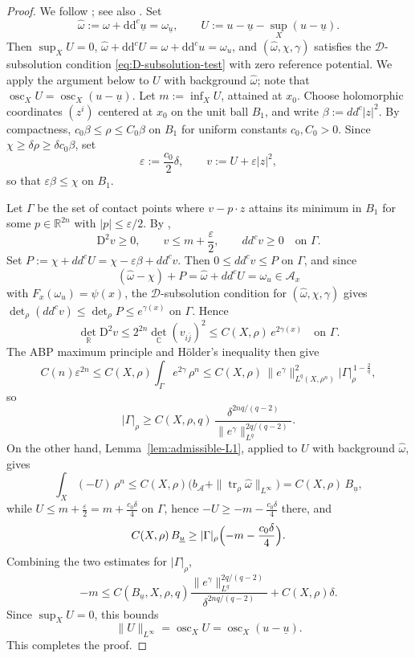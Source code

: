 \documentclass[oneside,english,letterpaper]{amsart}
\numberwithin{equation}{section}
\theoremstyle{plain}
\theoremstyle{definition}
\theoremstyle{remark}
\renewcommand{\d}{\mathrm{d}}
\newcommand{\ddc}{\d\d^c}
\def\D{\mathrm D}
\begin{document}
\begin{proof}
	We follow \cite[Proposition~11]{MR3807322}; see also
	\autocite{MR2156505}. Set
	\[
		\widehat\omega:=\omega+\ddc\underline u=\omega_{\underline u},
		\qquad
		U:=u-\underline u-\sup_X(u-\underline u).
	\]
	Then $\sup_XU=0$, $\widehat\omega+\ddc U=\omega+\ddc u=\omega_u$,
	and $(\widehat\omega,\chi,\gamma)$ satisfies the
	$\mathcal D$-subsolution condition \eqref{eq:D-subsolution-test}
	with zero reference potential. We apply the argument below to $U$
	with background $\widehat\omega$; note that
	$\operatorname{osc}_XU=\operatorname{osc}_X(u-\underline u)$.
	Let $m:=\inf_XU$, attained at $x_0$. Choose holomorphic
	coordinates $(z^i)$ centered at $x_0$ on the unit ball $B_1$, and
	write $\beta:=dd^c|z|^2$. By compactness,
	$c_0\beta\le\rho\le C_0\beta$ on $B_1$ for uniform constants
	$c_0,C_0>0$. Since $\chi\ge\delta\rho\ge\delta c_0\beta$, set
	\[
		\varepsilon:=\frac{c_0}{2}\delta,
		\qquad v:=U+\varepsilon|z|^2,
	\]
	so that $\varepsilon\beta\le\chi$ on $B_1$.

	Let $\Gamma$ be the set of contact points where $v-p\cdot z$
	attains its minimum in $B_1$ for some $p\in\mathbb R^{2n}$ with
	$|p|\le\varepsilon/2$. By \cite[Proposition~10]{MR3807322},
	\[
		\D^2v\ge0,\qquad v\le m+\frac{\varepsilon}{2},\qquad
		dd^cv\ge0\quad\text{on }\Gamma.
	\]
	Set $P:=\chi+dd^cU=\chi-\varepsilon\beta+dd^cv$. Then
	$0\le dd^cv\le P$ on $\Gamma$, and since
	\[(\widehat\omega-\chi)+P
	=\widehat\omega+dd^cU=\omega_u\in\mathcal A_x\] with
	$F_x(\omega_u)=\psi(x)$, the $\mathcal D$-subsolution condition
	for $(\widehat\omega,\chi,\gamma)$ gives
	$\det_\rho(dd^cv)\le\det_\rho P\le e^{\gamma(x)}$ on
	$\Gamma$. Hence
	\[
		\det_{\mathbb R}\D^2v
		\le 2^{2n}\det_{\mathbb C}(v_{i\bar j})^2
		\le C(X,\rho)\,e^{2\gamma(x)}
		\quad\text{on }\Gamma.
	\]
	The ABP maximum principle and H\"older's inequality then give
	\[
		C(n)\varepsilon^{2n}
		\le C(X,\rho)\int_\Gamma e^{2\gamma}\,\rho^n
		\le C(X,\rho)\,\|e^\gamma\|_{L^q(X,\rho^n)}^2
			|\Gamma|_\rho^{\,1-\frac{2}{q}},
	\]
	so
	\[
		|\Gamma|_\rho
		\ge
		C(X,\rho,q)\,
		\frac{\delta^{2nq/(q-2)}}
		{\|e^\gamma\|_{L^q}^{2q/(q-2)}}.
	\]
	On the other hand, Lemma~\ref{lem:admissible-L1}, applied to
	$U$ with background $\widehat\omega$, gives
	\[
		\int_X(-U)\,\rho^n
		\le C(X,\rho)\bigl(b_{\mathcal A}
			+\|\operatorname{tr}_\rho\widehat\omega\|_{L^\infty}\bigr)
		= C(X,\rho)\,B_{\underline u},
	\]
	while $U\le m+\frac{\varepsilon}{2}=m+\frac{c_0\delta}{4}$ on
	$\Gamma$, hence $-U\ge-m-\frac{c_0\delta}{4}$ there, and
	\[
		C(X,\rho)\,B_{\underline u}
		\ge |\Gamma|_\rho\Bigl(-m-\frac{c_0\delta}{4}\Bigr).
	\]
	Combining the two estimates for $|\Gamma|_\rho$,
	\[
		-m
		\le
		C(B_{\underline u},X,\rho,q)
		\frac{\|e^\gamma\|_{L^q}^{2q/(q-2)}}
		{\delta^{2nq/(q-2)}}
		+C(X,\rho)\delta.
	\]
	Since $\sup_XU=0$, this bounds
	\[\|U\|_{L^\infty}=\operatorname{osc}_XU
	=\operatorname{osc}_X(u-\underline u).\]
	This completes the proof.
\end{proof}

\raggedbottom
\printbibliography
\end{document}
